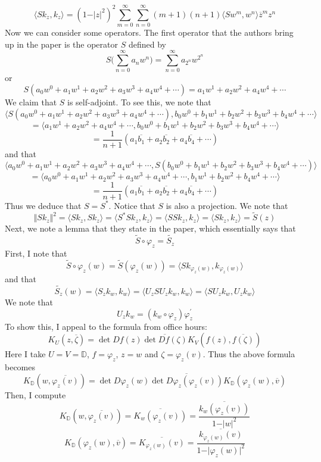 \documentclass[12pt]{article}
\begin{document}
\[
\langle Sk_z, k_z \rangle  = (1-\vert z \vert^2)^2 \sum_{m=0}^\infty \sum_{n=0}^\infty (m+1)(n+1) \langle Sw^m, w^n \rangle \overline{z}^m z^n
\] Now we can consider some operators. The first operator that the authors bring up in the paper is the operator $S$ defined by
\[
S\bigg(\sum_{n=0}^\infty a_n w^n\bigg) = \sum_{n=0}^\infty a_{2^n} w^{2^n}
\] or
\[
S(a_0w^0 + a_1w^1 + a_2w^2 + a_3w^3 + a_4 w^4 + \cdots) = a_1w^1 + a_2w^2 + a_4w^4 + \cdots
\] We claim that $S$ is self-adjoint. To see this, we note that
\[
\langle S(a_0w^0 + a_1w^1 + a_2w^2 + a_3w^3 + a_4 w^4 + \cdots), b_0w^0 + b_1w^1 + b_2w^2 + b_3w^3 + b_4 w^4 + \cdots \rangle
\]
\[
= \langle a_1 w^1 + a_2 w^2 + a_4 w^4 + \cdots, b_0w^0 + b_1w^1 + b_2w^2 + b_3w^3 + b_4 w^4 + \cdots \rangle 
\]
\[
= \frac{1}{n+1}(a_1 \overline{b_1} + a_2 \overline{b_2} + a_4 \overline{b_4} + \cdots)
\] and that
\[
\langle a_0w^0 + a_1w^1 + a_2w^2 + a_3w^3 + a_4 w^4 + \cdots, S(b_0w^0 + b_1w^1 + b_2w^2 + b_3w^3 + b_4 w^4 + \cdots) \rangle
\]
\[
= \langle a_0w^0 + a_1w^1 + a_2w^2 + a_3w^3 + a_4 w^4 + \cdots, b_1w^1 + b_2w^2 + b_4 w^4 + \cdots \rangle
\]
\[
= \frac{1}{n+1}(a_1\overline{b_1} + a_2 \overline{b_2} + a_4 \overline{b_4} + \cdots)
\] Thus we deduce that $S = S^*$. Notice that $S$ is also a projection. We note that
\[
\Vert Sk_z \Vert^2 = \langle Sk_z, Sk_z \rangle = \langle S^*Sk_z, k_z \rangle = \langle SSk_z, k_z \rangle = \langle Sk_z, k_z \rangle = \tilde{S}(z)
\]
 Next, we note a lemma that they state in the paper, which essentially says that
\[
\tilde{S} \circ \varphi_z = \widetilde{S_z}
\]
First, I note that 
\[
\tilde{S} \circ \varphi_z (w) = \tilde{S}(\varphi_z(w)) = \langle Sk_{\varphi_z(w)}, k_{\varphi_z(w)} \rangle
\] and that 
\[
\widetilde{S_z}(w) = \langle S_z k_w, k_w \rangle = \langle U_z S U_z k_w, k_w \rangle = \langle S U_z k_w,  U_z k_w \rangle
\] We note that
\[
U_z k_w = (k_w \circ \varphi_z) \varphi_z^\prime
\]
To show this, I appeal to the formula from office hours: 
\[
K_U(z, \overline{\zeta}) = \det Df(z) \overline{\det Df(\zeta)}  K_V(f(z), \overline{f(\zeta)})
\]
 Here I take $U = V = \mathbb{D}$, $f = \varphi_z$, $z = w$ and $\zeta = \varphi_z(v)$. Thus the above formula becomes 
 \[
 K_\mathbb{D}(w,\overline{\varphi_z(v)}) = \det D \varphi_z(w) \overline{\det D \varphi_z(\varphi_z(v))} K_\mathbb{D}(\varphi_z(w), \overline{v})
 \] Then, I compute 
 \[
 K_\mathbb{D}(w,\overline{\varphi_z(v)}) = \overline{K_w(\varphi_z(v))} = \overline{\frac{k_w(\varphi_z(v))}{1 - \vert w \vert^2}}
 \] 
 \[
 K_\mathbb{D}(\varphi_z(w), \overline{v}) = \overline{K_{\varphi_z(w)}(v)} = \overline{\frac{k_{\varphi_z(w)}(v)}{1- \vert \varphi_z(w) \vert^2}}
 \] 
\end{document}

